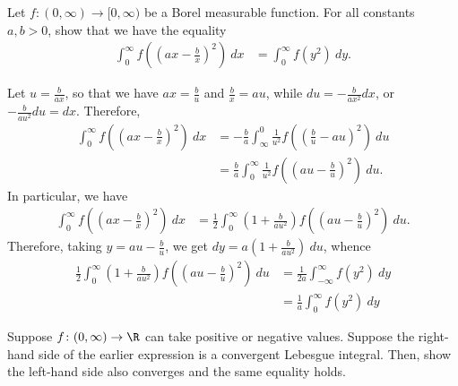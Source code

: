 \documentclass[10pt]{mypackage}
\begin{document}
\begin{problem}[Problem I.8]
  Let $f\colon (0,\infty)\to [0,\infty)$ be a Borel measurable function. For all constants $a,b > 0$, show that we have the equality
  \begin{align*}
    \int_{0}^{\infty} f\left( \left( ax - \frac{b}{x} \right)^{2} \right)\:dx &= \int_{0}^{\infty} f\left( y^2 \right)\:dy.
  \end{align*}
\end{problem}
\begin{solution}
  Let $u = \frac{b}{ax}$, so that we have $ax = \frac{b}{u}$ and $\frac{b}{x} = au$, while $du = -\frac{b}{ax^2}dx$, or $-\frac{b}{au^2}du = dx$. Therefore,
  \begin{align*}
    \int_{0}^{\infty} f\left( \left( ax - \frac{b}{x} \right)^2 \right)\:dx &= -\frac{b}{a}\int_{\infty}^{0} \frac{1}{u^2}f\left( \left( \frac{b}{u}- au \right)^2 \right)\:du\\
                                                                            &= \frac{b}{a} \int_{0}^{\infty} \frac{1}{u^2}f\left( \left( au-\frac{b}{u} \right)^2 \right)\:du.
  \end{align*}
  In particular, we have 
  \begin{align*}
    \int_{0}^{\infty} f\left( \left( ax - \frac{b}{x} \right)^2 \right)\:dx &= \frac{1}{2} \int_{0}^{\infty} \left( 1 + \frac{b}{au^2} \right)f\left( \left( au - \frac{b}{u} \right)^2 \right)\:du.
  \end{align*}
  Therefore, taking $y = au-\frac{b}{u}$, we get $dy = a\left( 1 + \frac{b}{au^2} \right)\:du$, whence
  \begin{align*}
    \frac{1}{2}\int_{0}^{\infty} \left( 1 + \frac{b}{au^2} \right)f\left( \left( au - \frac{b}{u} \right)^2 \right)\:du &= \frac{1}{2a} \int_{-\infty}^{\infty} f\left( y^2 \right)\:dy\\
                                                                                                                                  &= \frac{1}{a} \int_{0}^{\infty} f\left( y^2 \right)\:dy
  \end{align*}
\end{solution}
\begin{problem}[Problem I.9]
  Suppose $f\colon (0,\infty)\to \R$ can take positive or negative values. Suppose the right-hand side of the earlier expression is a convergent Lebesgue integral. Then, show the left-hand side also converges and the same equality holds.
\end{problem}
\end{document}
